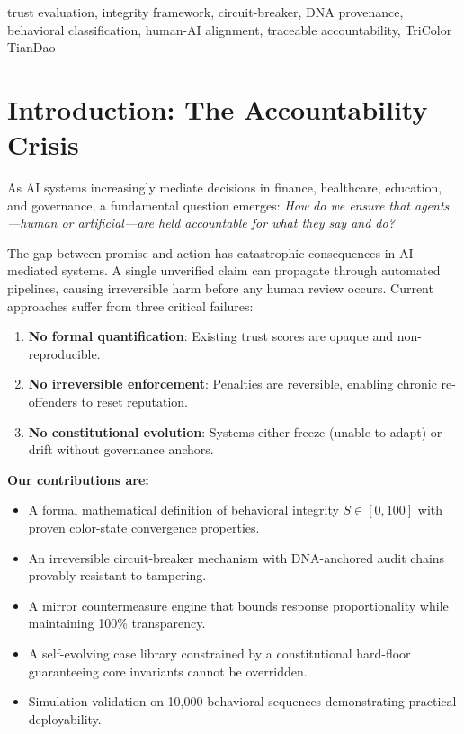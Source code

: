 \documentclass[conference]{IEEEtran}
\begin{document}
\begin{IEEEkeywords}
trust evaluation, integrity framework, circuit-breaker, DNA
provenance, behavioral classification, human-AI alignment,
traceable accountability, TriColor TianDao
\end{IEEEkeywords}

\section{Introduction: The Accountability Crisis}

As AI systems increasingly mediate decisions in finance, healthcare,
education, and governance, a fundamental question emerges:
\emph{How do we ensure that agents---human or artificial---are held
accountable for what they say and do?}

The gap between promise and action has catastrophic consequences in
AI-mediated systems.
A single unverified claim can propagate through automated pipelines,
causing irreversible harm before any human review occurs.
Current approaches suffer from three critical failures:

\begin{enumerate}
  \item \textbf{No formal quantification}: Existing trust scores are
  opaque and non-reproducible.
  \item \textbf{No irreversible enforcement}: Penalties are reversible,
  enabling chronic re-offenders to reset reputation.
  \item \textbf{No constitutional evolution}: Systems either freeze
  (unable to adapt) or drift without governance anchors.
\end{enumerate}

\noindent\textbf{Our contributions are:}
\begin{itemize}
  \item A formal mathematical definition of behavioral integrity
  $S \in [0,100]$ with proven color-state convergence properties.
  \item An irreversible circuit-breaker mechanism with DNA-anchored
  audit chains provably resistant to tampering.
  \item A mirror countermeasure engine that bounds response
  proportionality while maintaining 100\% transparency.
  \item A self-evolving case library constrained by a constitutional
  hard-floor guaranteeing core invariants cannot be overridden.
  \item Simulation validation on 10,000 behavioral sequences
  demonstrating practical deployability.
\end{itemize}
\end{document}
